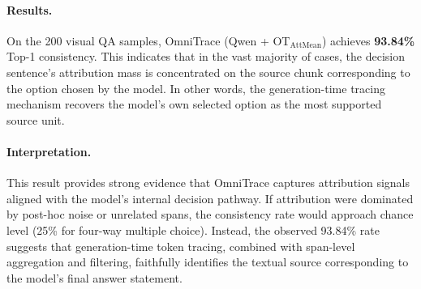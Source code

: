 \paragraph{Results.}
On the 200 visual QA samples, OmniTrace (Qwen + OT$_\text{AttMean}$) achieves \textbf{93.84\%} Top-1 consistency. This indicates that in the vast majority of cases, the decision sentence’s attribution mass is concentrated on the source chunk corresponding to the option chosen by the model.
In other words, the generation-time tracing mechanism recovers the model’s own selected option as the most supported source unit.

\paragraph{Interpretation.}
This result provides strong evidence that OmniTrace captures attribution signals aligned with the model’s internal decision pathway.
If attribution were dominated by post-hoc noise or unrelated spans, the consistency rate would approach chance level (25\% for four-way multiple choice).
Instead, the observed 93.84\% rate suggests that generation-time token tracing, combined with span-level aggregation and filtering, faithfully identifies the textual source corresponding to the model’s final answer statement.
